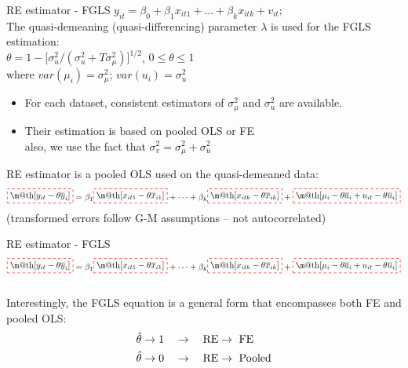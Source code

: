\documentclass{beamer}
\makeatletter
\newcommand*{\boxcolor}{red}
\renewcommand{\boxed}[1]{\textcolor{\boxcolor}{%
\tikz[baseline={([yshift=-1ex]current bounding box.center)}] \node [rectangle,semithick, minimum width=1ex,draw, dashed] {\normalcolor\m@th$\displaystyle#1$};}}
\makeatother
\begin{document}
\begin{frame}{RE estimator - FGLS}
$y_{it} = \beta_0 + \beta_1 x_{it1} + \dots + \beta_k x_{itk} + v_{it};$\\
The quasi-demeaning (quasi-differencing) parameter $\lambda$ is used for the FGLS estimation:\\
$\theta = 1 - \big[ \sigma^2_u / (\sigma^2_u + T \sigma^2_{\mu}) \big]^{1/2}$, \quad  $0 \le \theta \le 1$\\
where $\textit{var}(\mu_i) = \sigma^2_{\mu}$; \quad $\textit{var}(u_i) = \sigma^2_u$\\
\begin{itemize}
\item \small For each dataset, consistent estimators of $\sigma^2_{\mu}$ and $\sigma^2_u$ are available.\\
\item \small Their estimation is based on pooled OLS or FE \\ also, we use the fact that $\sigma^2_v = \sigma^2_{\mu} + \sigma^2_u$\\
\end{itemize}
\vspace{-0.1cm}
RE estimator is a pooled OLS used on the quasi-demeaned data:\\
\vspace{-0.3cm}
\small $$\boxed{[y_{it} - \theta \overline{y}_i]} = \beta_1  \boxed{[x_{it1}- \theta \overline{x}_{i1}]}+\dots+\beta_k \boxed{[x_{itk}- \theta \overline{x}_{ik}]}+ \boxed{[\mu_i - \theta \overline{a}_i + u_{it}-\theta \overline{u}_i]}$$
(transformed errors follow G-M assumptions -- not autocorrelated)
\end{frame}
\begin{frame}{RE estimator - FGLS}
\
{\footnotesize $$\boxed{[y_{it} - \theta \overline{y}_i]} = \beta_1 \boxed{[x_{it1}- \theta \overline{x}_{i1}]}+\dots+\beta_k \boxed{[x_{itk}- \theta \overline{x}_{ik}]}+\boxed{[\mu_i - \theta \overline{a}_i + u_{it}-\theta \overline{u}_i]}$$}\\
\bigskip
Interestingly, the FGLS equation is a general form that encompasses both FE and pooled OLS:
\bigskip
\begin{align*}
\hat{\theta} \rightarrow 1 \quad & \rightarrow \quad \textnormal{RE}  \rightarrow \ \textnormal{FE}\\
\hat{\theta} \rightarrow 0 \quad & \rightarrow \quad \textnormal{RE}  \rightarrow \ \textnormal{Pooled}
\end{align*}
\end{frame}
\end{document}
